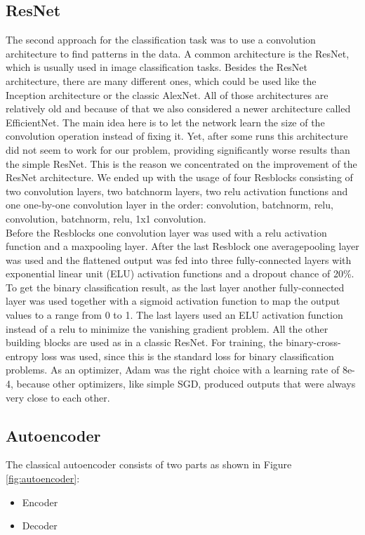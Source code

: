\documentclass[journal]{IEEEtran}
\begin{document}
\subsection{ResNet}
The second approach for the classification task was to use a convolution architecture to find patterns in the data. A common architecture is the ResNet, which is usually used in image classification tasks. Besides the ResNet architecture, there are many different ones, which could be used like the Inception architecture or the classic AlexNet. All of those architectures are relatively old and because of that we also considered a newer architecture called EfficientNet. The main idea here is to let the network learn the size of the convolution operation instead of fixing it. Yet, after some runs this architecture did not seem to work for our problem, providing significantly worse results than the simple ResNet. This is the reason we concentrated on the improvement of the ResNet architecture. We ended up with the usage of four Resblocks consisting of two convolution layers, two batchnorm layers, two relu activation functions and one one-by-one convolution layer in the order: convolution, batchnorm, relu, convolution, batchnorm, relu, 1x1 convolution.\\Before the Resblocks one convolution layer was used with a relu activation function and a maxpooling layer. After the last Resblock one averagepooling layer was used and the flattened output was fed into three fully-connected layers with exponential linear unit (ELU) activation functions and a dropout chance of 20\%. To get the binary classification result, as the last layer another fully-connected layer was used together with a sigmoid activation function to map the output values to a range from 0 to 1. The last layers used an ELU activation function instead of a relu to minimize the vanishing gradient problem. All the other building blocks are used as in a classic ResNet. For training, the binary-cross-entropy loss was used, since this is the standard loss for binary classification problems. As an optimizer, Adam was the right choice with a learning rate of 8e-4, because other optimizers, like simple SGD, produced outputs that were always very close to each other.

\subsection{Autoencoder}
The classical autoencoder consists of two parts as shown in Figure \ref{fig:autoencoder}:
\begin{itemize}
\item Encoder
\item Decoder
\end{itemize}
\end{document}
